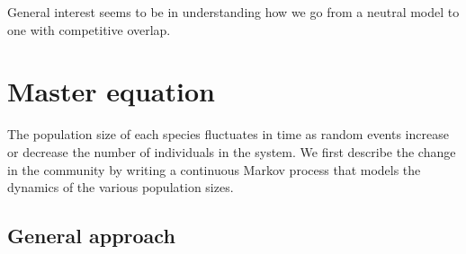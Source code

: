 \documentclass[11pt,a4paper,final]{iopart}
\begin{document}
General interest seems to be in understanding how we go from a neutral model to one with competitive overlap.

\section{Master equation}

The population size of each species fluctuates in time as random events increase or decrease the number of individuals in the system. 
We first describe the change in the community by writing a continuous Markov process that models the dynamics of the various population sizes.

\subsection{General approach}
\end{document}
